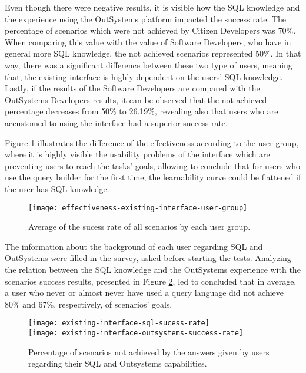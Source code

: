 Even though there were negative results, it is visible how the SQL knowledge and the experience using the OutSystems platform impacted the success rate. The percentage of scenarios which were not achieved by Citizen Developers was 70\%. When comparing this value with the value of Software Developers, who have in general more SQL knowledge, the not achieved scenarios represented 50\%. In that way, there was a significant difference between these two type of users, meaning that, the existing interface is highly dependent on the users' SQL knowledge. Lastly, if the results of the Software Developers are compared with the OutSystems Developers results, it can be observed that the not achieved percentage decreases from 50\% to 26.19\%, revealing also that users who are accustomed to using the interface had a superior success rate.

Figure \ref{fig:effectivenessExistingInterfaceUserGroup} illustrates the difference of the effectiveness according to the user group, where it is highly visible the usability problems of the interface which are preventing users to reach the tasks' goals, allowing to conclude that for users who use the query builder for the first time, the learnability curve could be flattened if the user has SQL knowledge.


\begin{figure}[htbp]
	\centering
	\texttt{[image: effectiveness-existing-interface-user-group]}
	\caption{Average of the sucess rate of all scenarios by each user group.}
	\label{fig:effectivenessExistingInterfaceUserGroup}
\end{figure}

The information about the background of each user regarding SQL and OutSystems were filled in the survey, asked before starting the tests. Analyzing the relation between the SQL knowledge and the OutSystems experience with the scenarios success results, presented in Figure \ref{fig:existingInterfaceSqlOutsystemsSuccessRate}, led to concluded that in average, a user who never or almost never have used a query language did not achieve 80\% and 67\%, respectively, of scenarios' goals.

\begin{figure}[tb]
    \centering
      {\texttt{[image: existing-interface-sql-sucess-rate]}}%
      \\
      {\texttt{[image: existing-interface-outsystems-success-rate]}}%
  \caption{Percentage of scenarios not achieved by the answers given by users regarding their SQL and Outsystems capabilities.}
    \label{fig:existingInterfaceSqlOutsystemsSuccessRate}
  \end{figure}


